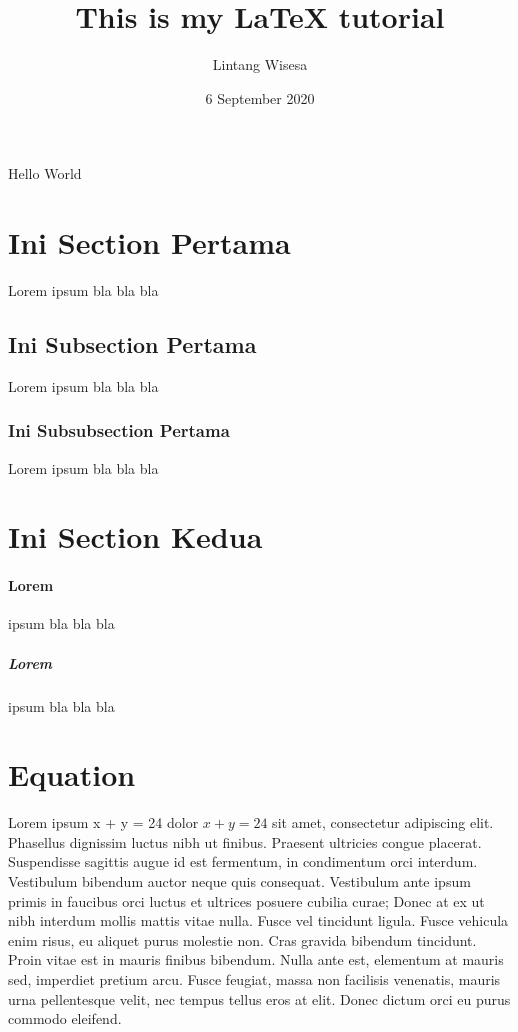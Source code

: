 \documentclass{article}
\title{This is my LaTeX tutorial} %
\author{Lintang Wisesa}           %
\date{6 September 2020}           %
\begin{document}
    \maketitle
    Hello World

    \newpage
    
    \section{Ini Section Pertama}
    Lorem ipsum bla bla bla
    \subsection{Ini Subsection Pertama}
    Lorem ipsum bla bla bla
    \subsubsection{Ini Subsubsection Pertama}
    Lorem ipsum bla bla bla

    \section{Ini Section Kedua}
    \paragraph{Lorem}
    ipsum bla bla bla
        \subparagraph{Lorem}
        ipsum bla bla bla

    \section{Equation}
    Lorem ipsum x + y = 24 dolor $x + y = 24$ sit amet, consectetur adipiscing elit. Phasellus dignissim luctus nibh ut finibus. Praesent ultricies congue placerat. Suspendisse sagittis augue id est fermentum, in condimentum orci interdum. Vestibulum bibendum auctor neque quis consequat. Vestibulum ante ipsum primis in faucibus orci luctus et ultrices posuere cubilia curae; Donec at ex ut nibh interdum mollis mattis vitae nulla. Fusce vel tincidunt ligula. Fusce vehicula enim risus, eu aliquet purus molestie non. Cras gravida bibendum tincidunt. Proin vitae est in mauris finibus bibendum. Nulla ante est, elementum at mauris sed, imperdiet pretium arcu. Fusce feugiat, massa non facilisis venenatis, mauris urna pellentesque velit, nec tempus tellus eros at elit. Donec dictum orci eu purus commodo eleifend.
    
\end{document}
